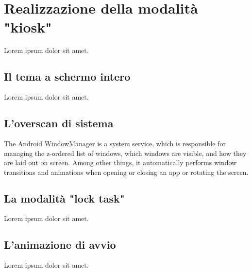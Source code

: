 \chapter{Realizzazione della modalità "kiosk"}
\label{cha:kiosk}
Lorem ipsum dolor sit amet.

\section{Il tema a schermo intero}
\label{sec:kiosk_fullscreen}

Lorem ipsum dolor sit amet.

\section{L'overscan di sistema}
\label{sec:kiosk_overscan}

The Android WindowManager is a system service, which is responsible for managing the z-ordered list of windows, which windows are visible, and how they are laid out on screen. Among other things, it automatically performs window transitions and animations when opening or closing an app or rotating the screen.

\section{La modalità "lock task"}
\label{sec:kiosk_locktask}

Lorem ipsum dolor sit amet.

\section{L'animazione di avvio}
\label{sec:kiosk_bootanimation}

Lorem ipsum dolor sit amet.

